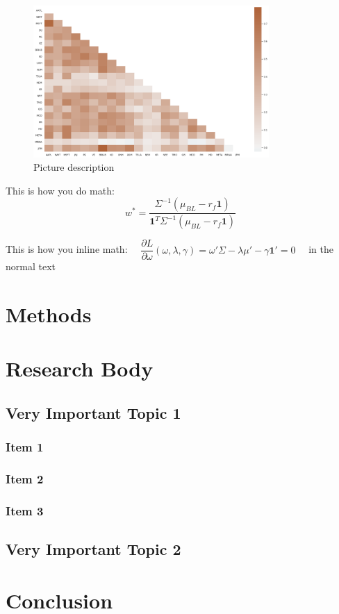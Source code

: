\begin{figure}[ht]
    \begin{center}
        \includegraphics[width=0.8\textwidth]{img/fig1.png}
        \caption{Picture description}
        \label{fig:figure1}
    \end{center}
\end{figure}

This is how you do math:
$$
w^*=\frac{\Sigma^{-1}(\mu_{BL}-r_f\mathbf{1})}{\mathbf{1}^T\Sigma^{-1}(\mu_{BL}-r_f\mathbf{1})}
$$

This is how you inline math: 
$\quad \dfrac{\partial L}{\partial \omega}(\omega, \lambda, \gamma) = \omega'\Sigma - \lambda\mu' - \gamma\mathbf{1}' = 0 \quad$ 
in the normal text

\newpage
\section{Methods}
\section{Research Body}
\subsection{Very Important Topic 1}
\subsubsection{Item 1}
\subsubsection{Item 2}
\subsubsection{Item 3}
\newpage
\subsection{Very Important Topic 2}
\newpage
\section{Conclusion}
